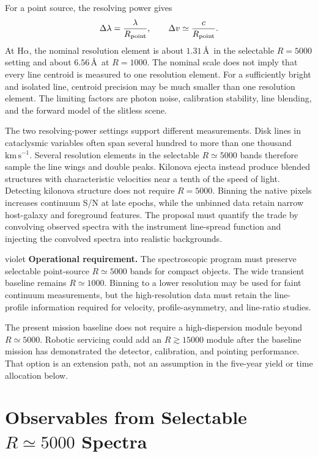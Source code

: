 \documentclass[10pt,onecolumn]{article}
\newcommand{\Rpoint}{R_{\rm point}}
\newcommand{\kms}{\mathrm{km\,s^{-1}}}
\begin{document}
For a point source, the resolving power gives
\begin{equation}
  \Delta\lambda = \frac{\lambda}{\Rpoint},
  \qquad
  \Delta v \simeq \frac{c}{\Rpoint}.
  \label{eq:resolution}
\end{equation}
At H$\alpha$, the nominal resolution element is about $1.31$\,\AA\ in the
selectable $R=5000$ setting and about $6.56$\,\AA\ at $R=1000$. The nominal
scale does not imply that every line centroid is measured to one resolution
element.
For a sufficiently bright and isolated line, centroid precision may be much
smaller than one resolution element. The limiting factors are photon noise,
calibration stability, line blending, and the forward model of the
slitless scene.

The two resolving-power settings support different measurements. Disk lines
in cataclysmic variables often span several hundred to more than one thousand
$\kms$. Several resolution elements in the selectable $R\simeq5000$ bands
therefore sample the line wings and double peaks. Kilonova ejecta instead
produce blended structures with characteristic velocities near a tenth of the
speed of light. Detecting kilonova structure does not require $R=5000$.
Binning the native pixels increases continuum S/N at late epochs, while the
unbinned data retain narrow host-galaxy and foreground features. The proposal
must quantify the trade by convolving observed spectra with the instrument
line-spread function and injecting the convolved spectra into realistic
backgrounds.

\begin{xresultbox}{violet}
\textbf{Operational requirement.}
The spectroscopic program must preserve selectable point-source $R\simeq5000$
bands for compact objects. The wide transient baseline remains $R\simeq1000$.
Binning to a lower resolution may be used for faint continuum measurements,
but the high-resolution data must retain the line-profile information required
for velocity, profile-asymmetry, and line-ratio studies.
\end{xresultbox}

The present mission baseline does not require a high-dispersion module beyond
$R\simeq5000$. Robotic servicing could add an $R\gtrsim15000$ module after the
baseline mission has demonstrated the detector, calibration, and pointing
performance. That option is an extension path, not an assumption in the
five-year yield or time allocation below.

\section{Observables from Selectable \texorpdfstring{$R\simeq5000$}{R approximately 5000} Spectra}
\end{document}
